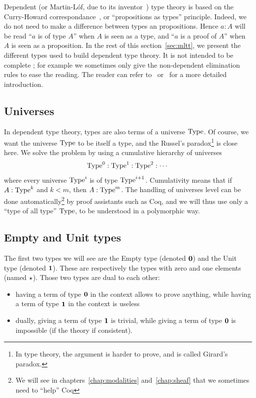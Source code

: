 Dependent (or Martin-L\'of, due to its inventor~\cite{mltt}) type
theory is based on the Curry-Howard correspondance~\cite{Howard80}, or
``propositions as types'' principle. Indeed, we do not need to make a
difference between types an propositions. Hence $a:A$ will be read
``$a$ is of type $A$'' when $A$ is seen as a type, and ``$a$ is a
proof of $A$'' when $A$ is seen as a proposition. In the rest of this
section~\ref{sec:mltt}, we present the different types used to build
dependent type theory. It is not intended to be complete ; for example
we sometimes only give the non-dependent elimination rules to ease the
reading. The reader
can refer to~\cite{nordstrom2001martin} or~\cite{hottbook} for a more
detailed introduction.


\subsection{Universes}
\label{ssec:universes}
In dependent type theory, types are also terms of a universe
$\operatorname{Type}$. Of course, we want the universe $\operatorname{Type}$ to be itself a type,
and the Russel's paradox\footnote{In type theory, the argument is
  harder to prove, and is called Girard's paradox.} is close here.
We solve the problem by using a cumulative hierarchy of universes
\[ \operatorname{Type}^0 : \operatorname{Type}^1 : \operatorname{Type}^2 :\cdots \]
where every universe $\operatorname{Type}^i$ is of type $\operatorname{Type}^{i+1}$. Cumulativity means
that if $A:\operatorname{Type}^k$ and $k<m$, then $A:\operatorname{Type}^m$. The handling of
universes level can be done automatically\footnote{We will see in
  chapters~\ref{chap:modalities} and~\ref{chap:sheaf} that we
  sometimes need to ``help'' Coq}
 by proof assistants such as Coq,
and we will thus use only a ``type of all type'' $\operatorname{Type}$, to be understood
in a polymorphic way.

\subsection{Empty and Unit types}
\label{ssec:unit_empty}

The first two types we will see are the Empty type (denoted
$\mathbf{0}$) and the Unit type (denoted
$\mathbf{1}$).
These are respectively the types with zero and one elements (named $\star$). Those two
types are dual to each other:
\begin{itemize}
\item having a term of type $\mathbf{0}$ in the context allows to prove
  anything, while having a term of type $\mathbf{1}$ in the context is
  useless
\item dually, giving a term of type $\mathbf{1}$ is trivial, while giving a
  term of type $\mathbf{0}$ is impossible (if the theory if consistent).
\end{itemize}

